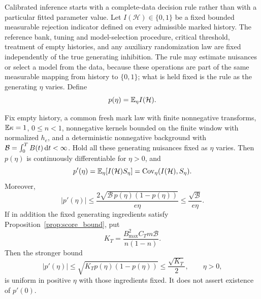 Calibrated inference starts with a complete-data decision rule rather than with a particular fitted parameter value. Let \(I(\mathcal H)\in\{0,1\}\) be a fixed bounded measurable rejection indicator defined on every admissible marked history. The reference bank, tuning and model-selection procedure, critical threshold, treatment of empty histories, and any auxiliary randomization law are fixed independently of the true generating inhibition. The rule may estimate nuisances or select a model from the data, because these operations are part of the same measurable mapping from history to \(\{0,1\}\); what is held fixed is the rule as the generating \(\eta\) varies. Define
\[
p(\eta)=\mathbb{E} _\eta I(\mathcal H).
\]

\begin{proposition}
\label{prop:power_response}
Fix empty history, a common fresh mark law with finite nonnegative transforms, \(\mathbb{E} \kappa=1\), \(0\le n<1\), nonnegative kernels bounded on the finite window with normalized \(h_e\), and a deterministic nonnegative background with \(\mathcal B=\int_0^TB(t)\mathop{}\!\mathrm{d} t<\infty\). Hold all these generating nuisances fixed as \(\eta\) varies. Then \(p(\eta)\) is continuously differentiable for \(\eta>0\), and
\[
p'(\eta)=\mathbb{E} _\eta[I(\mathcal H)S_\eta]
=\mathrm{Cov}_\eta(I(\mathcal H),S_\eta).
\]
Moreover,
\[
|p'(\eta)|
\le
\frac{2\sqrt{\mathcal B\,p(\eta)(1-p(\eta))}}{e\eta}
\le
\frac{\sqrt{\mathcal B}}{e\eta}.
\]
If in addition the fixed generating ingredients satisfy Proposition~\ref{prop:score_bound}, put
\[
K_T=\frac{B_{\max}^2C_Tm\mathcal B}{n(1-n)}.
\]
Then the stronger bound
\[
|p'(\eta)|\leq\sqrt{K_Tp(\eta)(1-p(\eta))}
\leq\frac{\sqrt{K_T}}2,\qquad \eta>0,
\]
is uniform in positive \(\eta\) with those ingredients fixed. It does not assert existence of \(p'(0)\).
\end{proposition}

